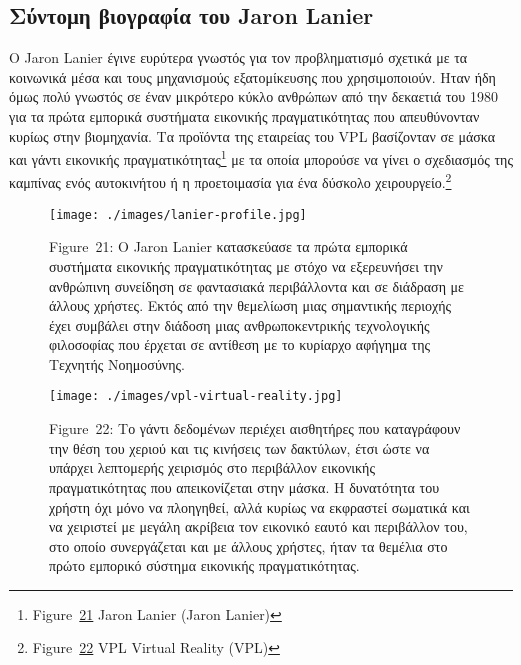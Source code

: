 \documentclass[
]{article}
\begin{document}
\hypertarget{ux3c3ux3cdux3bdux3c4ux3bfux3bcux3b7-ux3b2ux3b9ux3bfux3b3ux3c1ux3b1ux3c6ux3afux3b1-ux3c4ux3bfux3c5-jaron-lanier}{%
\subsection{Σύντομη βιογραφία του Jaron
Lanier}\label{ux3c3ux3cdux3bdux3c4ux3bfux3bcux3b7-ux3b2ux3b9ux3bfux3b3ux3c1ux3b1ux3c6ux3afux3b1-ux3c4ux3bfux3c5-jaron-lanier}}

Ο Jaron Lanier έγινε ευρύτερα γνωστός για τον προβληματισμό σχετικά με
τα κοινωνικά μέσα και τους μηχανισμούς εξατομίκευσης που χρησιμοποιούν.
Ηταν ήδη όμως πολύ γνωστός σε έναν μικρότερο κύκλο ανθρώπων από την
δεκαετιά του 1980 για τα πρώτα εμπορικά συστήματα εικονικής
πραγματικότητας που απευθύνονταν κυρίως στην βιομηχανία. Τα προϊόντα της
εταιρείας του VPL βασίζονταν σε μάσκα και γάντι εικονικής
πραγματικότητας\footnote{Figure~\protect\hyperlink{fig:lanier-profile}{21}
  Jaron Lanier (Jaron Lanier)} με τα οποία μπορούσε να γίνει ο
σχεδιασμός της καμπίνας ενός αυτοκινήτου ή η προετοιμασία για ένα
δύσκολο χειρουργείο.\footnote{Figure~\protect\hyperlink{fig:vpl-virtual-reality}{22}
  VPL Virtual Reality (VPL)}

\leavevmode{}%
\begin{figure}
\hypertarget{fig:lanier-profile}{%
\centering
\texttt{[image: ./images/lanier-profile.jpg]}
\caption{Figure~21: Ο Jaron Lanier κατασκεύασε τα πρώτα εμπορικά
συστήματα εικονικής πραγματικότητας με στόχο να εξερευνήσει την
ανθρώπινη συνείδηση σε φαντασιακά περιβάλλοντα και σε διάδραση με άλλους
χρήστες. Εκτός από την θεμελίωση μιας σημαντικής περιοχής έχει συμβάλει
στην διάδοση μιας ανθρωποκεντρικής τεχνολογικής φιλοσοφίας που έρχεται
σε αντίθεση με το κυρίαρχο αφήγημα της Τεχνητής
Νοημοσύνης.}\label{fig:lanier-profile}
}
\end{figure}

\leavevmode{}%
\begin{figure}
\hypertarget{fig:vpl-virtual-reality}{%
\centering
\texttt{[image: ./images/vpl-virtual-reality.jpg]}
\caption{Figure~22: Το γάντι δεδομένων περιέχει αισθητήρες που
καταγράφουν την θέση του χεριού και τις κινήσεις των δακτύλων, έτσι ώστε
να υπάρχει λεπτομερής χειρισμός στο περιβάλλον εικονικής πραγματικότητας
που απεικονίζεται στην μάσκα. Η δυνατότητα του χρήστη όχι μόνο να
πλοηγηθεί, αλλά κυρίως να εκφραστεί σωματικά και να χειριστεί με μεγάλη
ακρίβεια τον εικονικό εαυτό και περιβάλλον του, στο οποίο συνεργάζεται
και με άλλους χρήστες, ήταν τα θεμέλια στο πρώτο εμπορικό σύστημα
εικονικής πραγματικότητας.}\label{fig:vpl-virtual-reality}
}
\end{figure}
\end{document}
